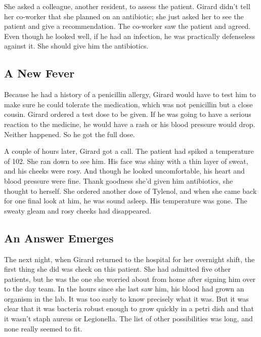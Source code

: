 She asked a colleague, another resident, to assess the patient. Girard
didn't tell her co-worker that she planned on an antibiotic; she just
asked her to see the patient and give a recommendation. The co-worker
saw the patient and agreed. Even though he looked well, if he had an
infection, he was practically defenseless against it. She should give
him the antibiotics.

\hypertarget{a-new-fever}{%
\subsection{\texorpdfstring{\textbf{A New
Fever}}{A New Fever}}\label{a-new-fever}}

Because he had a history of a penicillin allergy, Girard would have to
test him to make sure he could tolerate the medication, which was not
penicillin but a close cousin. Girard ordered a test dose to be given.
If he was going to have a serious reaction to the medicine, he would
have a rash or his blood pressure would drop. Neither happened. So he
got the full dose.

A couple of hours later, Girard got a call. The patient had spiked a
temperature of 102. She ran down to see him. His face was shiny with a
thin layer of sweat, and his cheeks were rosy. And though he looked
uncomfortable, his heart and blood pressure were fine. Thank goodness
she'd given him antibiotics, she thought to herself. She ordered another
dose of Tylenol, and when she came back for one final look at him, he
was sound asleep. His temperature was gone. The sweaty gleam and rosy
cheeks had disappeared.

\hypertarget{an-answer-emerges}{%
\subsection{\texorpdfstring{\textbf{An Answer
Emerges}}{An Answer Emerges}}\label{an-answer-emerges}}

The next night, when Girard returned to the hospital for her overnight
shift, the first thing she did was check on this patient. She had
admitted five other patients, but he was the one she worried about from
home after signing him over to the day team. In the hours since she last
saw him, his blood had grown an organism in the lab. It was too early to
know precisely what it was. But it was clear that it was bacteria robust
enough to grow quickly in a petri dish and that it wasn't staph aureus
or Legionella. The list of other possibilities was long, and none really
seemed to fit.

